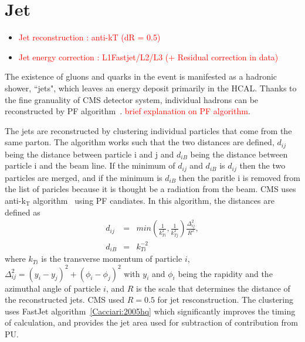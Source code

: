 \section{ Jet }
\label{sec:jetselection}
\begin{itemize}
\item \textcolor{red}{Jet reconstruction : anti-kT (dR = 0.5) }
\item \textcolor{red}{Jet energy correction : L1Fastjet/L2/L3 (+ Residual correction in data) }
\end{itemize}

The existence of gluons and quarks in the event is manifested as a hadronic shower, 
``jets", which leaves an energy deposit primarily in the HCAL. 
Thanks to the fine granuality of CMS detector system, individual hadrons can 
be reconstructed by PF algorithm~\cite{}. 
\textcolor{red}{brief explanation on PF algorithm}. 

The jets are reconstructed by clustering individual particles
that come from the same parton. The algorithm works 
such that the two distances are defined, $d_{ij}$ being the 
distance between particle i and j and $d_{iB}$ being the 
distance between particle i and the beam line. If the minimum 
of $d_{ij}$ and $d_{iB}$ is $d_{ij}$ then the two particles are merged,
and if the minimum is $d_{iB}$ then the paritle i is removed from 
the list of paricles because it is thought be a radiation from the beam. 
CMS uses anti-$\textrm{k}_\textrm{T}$ algorithm~\cite{Cacciari:2008gp} 
using PF candiates.  
In this algorithm, the distances are defined as 
\begin{eqnarray} 
d_{ij} 
&=&   
min \left( \frac{1}{k_{Ti}^2}, \frac{1}{k_{Tj}^2} \right) 
\frac{\Delta_{ij}^2}{R^2}, \\ 
d_{iB} 
&=&  
k_{Ti}^{-2}
\end{eqnarray} 
where $k_{Ti}$ is the transverse momentum of particle $i$, 
$\Delta_{ij}^2 = \left( y_i - y_j \right)^2 + \left( \phi_i - \phi_j \right)^2$ 
with $y_i$ and $\phi_i$ being the rapidity and the azimuthal angle of particle $i$,
and $R$ is the scale that determines the distance of the reconstructed jets.   
CMS used $R = 0.5$ for jet resconstruction. 
The clustering uses FastJet algorithm~\ref{Cacciari:2005hq} which
significantly improves the timing of calculation, and provides  
the jet area used for subtraction of contribution from PU. 

